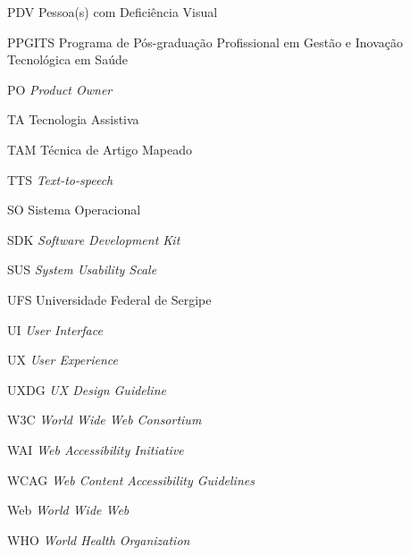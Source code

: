 \begin{siglas}
	\item[PDV]{Pessoa(s) com Deficiência Visual}
	\item[PPGITS]{Programa de Pós-graduação Profissional em Gestão e Inovação Tecnológica em Saúde}
	\item[PO]{\emph{Product Owner}}
	\item[TA]{Tecnologia Assistiva}
	\item[TAM]{Técnica de Artigo Mapeado}
	\item[TTS]{\textit{Text-to-speech}}
	\item[SO]{Sistema Operacional}
	\item[SDK]{\textit{Software Development Kit}}
	\item[SUS]{\textit{System Usability Scale}}
	\item[UFS]{Universidade Federal de Sergipe}
	\item[UI]{\textit{User Interface}}
	\item[UX]{\textit{User Experience}}
	\item[UXDG]{\textit{UX Design Guideline}}
	\item[W3C]{\textit{World Wide Web Consortium}}
	\item[WAI]{\textit{Web Accessibility Initiative}}
	\item[WCAG]{\textit{Web Content Accessibility Guidelines}}
	\item[Web]{\textit{World Wide Web}}
	\item[WHO]{\textit{World Health Organization}}
\end{siglas}